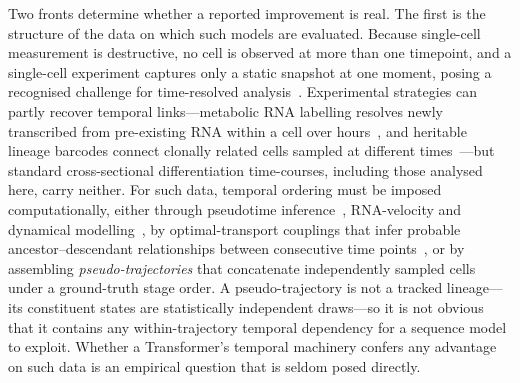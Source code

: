 \documentclass[pdflatex,sn-mathphys-num]{sn-jnl}
\theoremstyle{thmstyleone}%
\theoremstyle{thmstyletwo}%
\theoremstyle{thmstylethree}%
\begin{document}
Two fronts determine whether a reported improvement is real. The first is the structure of the data on which such models are evaluated. Because single-cell measurement is destructive, no cell is observed at more than one timepoint, and a single-cell experiment captures only a static snapshot at one moment, posing a recognised challenge for time-resolved analysis~\cite{la2018rna}. Experimental strategies can partly recover temporal links---metabolic RNA labelling resolves newly transcribed from pre-existing RNA within a cell over hours~\cite{erhard2019scslam,cao2020scifate}, and heritable lineage barcodes connect clonally related cells sampled at different times~\cite{weinreb2020lineage}---but standard cross-sectional differentiation time-courses, including those analysed here, carry neither. For such data, temporal ordering must be imposed computationally, either through pseudotime inference~\cite{saelens2019comparison,haghverdi2016diffusion}, RNA-velocity and dynamical modelling~\cite{la2018rna,bergen2020generalizing}, by optimal-transport couplings that infer probable ancestor--descendant relationships between consecutive time points~\cite{schiebinger2019optimal,lavenant2024toward}, or by assembling \emph{pseudo-trajectories} that concatenate independently sampled cells under a ground-truth stage order. A pseudo-trajectory is not a tracked lineage---its constituent states are statistically independent draws---so it is not obvious that it contains any within-trajectory temporal dependency for a sequence model to exploit. Whether a Transformer's temporal machinery confers any advantage on such data is an empirical question that is seldom posed directly.
\end{document}
